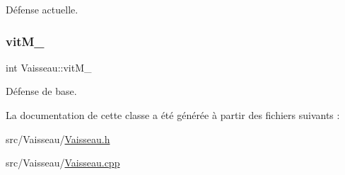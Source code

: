 Défense actuelle. 

\mbox{\label{class_vaisseau_a7cf3915f4d4044ee28fd5e5633fce11c}} 
\subsubsection{\texorpdfstring{vit\+M\+\_\+}{vitM\_}}
{\footnotesize\ttfamily int Vaisseau\+::vit\+M\+\_\+\hspace{0.3cm}{\ttfamily [protected]}}



Défense de base. 



La documentation de cette classe a été générée à partir des fichiers suivants \+:\begin{DoxyCompactItemize}
\item 
src/\+Vaisseau/\hyperlink{_vaisseau_8h}{Vaisseau.\+h}\item 
src/\+Vaisseau/\hyperlink{_vaisseau_8cpp}{Vaisseau.\+cpp}\end{DoxyCompactItemize}

